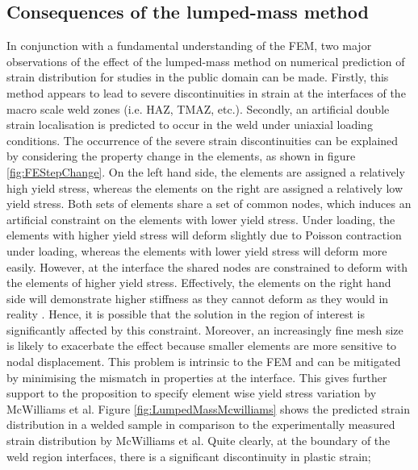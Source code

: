 \subsection{Consequences of the lumped-mass method}
\label{Intro:ConsequencesLMM}
In conjunction with a fundamental understanding of the FEM, two major observations of the effect of the lumped-mass method on numerical prediction of strain distribution for studies in the public domain can be made. Firstly, this method appears to lead to severe discontinuities in strain at the interfaces of the macro scale weld zones (i.e. HAZ, TMAZ, etc.). Secondly, an artificial double strain localisation is predicted to occur in the weld under uniaxial loading conditions. The occurrence of the severe strain discontinuities can be explained by considering the property change in the elements, as shown in figure \ref{fig:FEStepChange}. On the left hand side, the elements are assigned a relatively high yield stress, whereas the elements on the right are assigned a relatively low yield stress. Both sets of elements share a set of common nodes, which induces an artificial constraint on the elements with lower yield stress. Under loading, the elements with higher yield stress will deform slightly due to Poisson contraction under loading, whereas the elements with lower yield stress will deform more easily. However, at the interface the shared nodes are constrained to deform with the elements of higher yield stress. Effectively, the elements on the right hand side will demonstrate higher stiffness as they cannot deform as they would in reality
\cite{Hallquist2006}. 
Hence, it is possible that the solution in the region of interest is significantly affected by this constraint. Moreover, an increasingly fine mesh size is likely to exacerbate the effect because smaller elements are more sensitive to nodal displacement. This problem is intrinsic to the FEM and can be mitigated by minimising the mismatch in properties at the interface. This gives further support to the proposition to specify element wise yield stress variation by McWilliams et al. Figure \ref{fig:LumpedMassMcwilliams} shows the predicted strain distribution in a welded sample in comparison to the experimentally measured strain distribution by McWilliams et al. \cite{McWilliams2013} Quite clearly, at the boundary of the weld region interfaces, there is a significant discontinuity in plastic strain;
